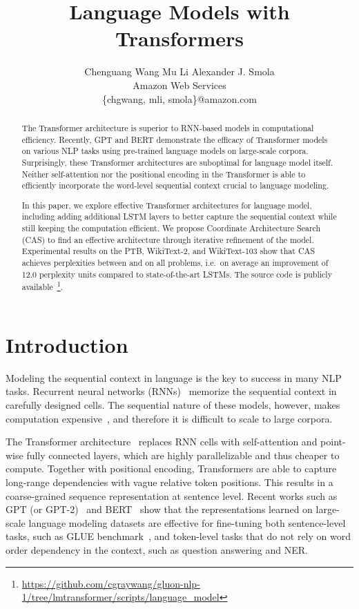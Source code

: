 \documentclass[11pt,a4paper]{article}
\title{Language Models with Transformers}
\author{
 Chenguang Wang \qquad Mu Li \qquad Alexander J. Smola \\
  Amazon Web Services \\
  {\sf \{chgwang, mli, smola\}@amazon.com} \\
}
\date{}
\begin{document}
\maketitle

\begin{abstract}
    
The Transformer architecture is superior to RNN-based models in computational efficiency. Recently, GPT and BERT demonstrate the efficacy of Transformer models on various NLP tasks using pre-trained language models on large-scale corpora. Surprisingly, these Transformer architectures are suboptimal for language model itself. Neither self-attention nor the positional encoding in the Transformer is able to efficiently incorporate the word-level sequential context crucial to language modeling. 

In this paper, we explore effective Transformer architectures for language model, including adding additional LSTM layers to better capture the sequential context while still keeping the computation efficient. We propose Coordinate Architecture Search (CAS) to find an effective architecture through iterative refinement of the model. Experimental results on the PTB, WikiText-2, and WikiText-103 show that CAS achieves perplexities between  and  on all problems, i.e.\ on average an improvement of 12.0 perplexity units compared to state-of-the-art LSTMs. The source code is publicly available~\footnote{\url{https://github.com/cgraywang/gluon-nlp-1/tree/lmtransformer/scripts/language_model}}.

\end{abstract} \section{Introduction}

Modeling the sequential context in language is the key to success in many NLP tasks. Recurrent neural networks (RNNs)~\cite{mikolov2010recurrent} memorize the sequential context in carefully designed cells. The sequential nature of these models, however, makes computation expensive~\cite{Merity02182,Yang03953}, and therefore it is difficult to scale to large corpora.

The Transformer architecture~\cite{vaswani2017attention} replaces RNN cells with self-attention and point-wise fully connected layers, which are highly parallelizable and thus cheaper to compute. Together with positional encoding, Transformers are able to capture long-range dependencies with vague relative token positions. This results in a coarse-grained sequence representation at sentence level. Recent works such as GPT (or GPT-2)~\cite{radford2018improving,radford2019language} and BERT~\cite{devlin2018bert} show that the representations learned on large-scale language modeling datasets are effective for fine-tuning both sentence-level tasks, such as GLUE benchmark~\cite{wang2018glue}, and token-level tasks that do not rely on word order dependency in the context, such as question answering and NER.
\end{document}

